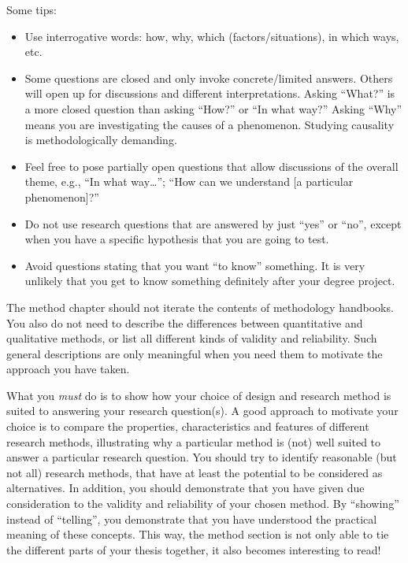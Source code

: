 \documentclass[a4paper,twoside]{bth}
\begin{document}
Some tips:
\begin{itemize}
    \item Use interrogative words: how, why, which (factors/situations), in which ways, etc.
    \item Some questions are closed and only invoke concrete/limited answers. Others will open up for discussions and different interpretations.
    Asking ``What?'' is a more closed question than asking ``How?'' or ``In what way?'' Asking ``Why'' means you are investigating the causes of a phenomenon. Studying causality is methodologically demanding.
    \item Feel free to pose partially open questions that allow discussions of the overall theme, e.g., ``In what way\dots''; ``How can we understand [a particular phenomenon]?''
    \item Do not use research questions that are answered by just ``yes'' or ``no'', except when you have a specific hypothesis that you are going to test.
    \item Avoid questions stating that you want ``to know'' something. It is very unlikely that you get to know something definitely after your degree project.
\end{itemize}

The method chapter should not iterate the contents of methodology handbooks. You also do not need to describe the differences between quantitative and qualitative methods, or list all different kinds of validity and reliability. Such general descriptions are only meaningful when you need them to motivate the approach you have taken.

What you \emph{must} do is to show how your choice of design and research method is suited to answering your research question(s). A good approach to motivate your choice is to compare the properties, characteristics and features of different research methods, illustrating why a particular method is (not) well suited to answer a particular research question. You should try to identify reasonable (but not all) research methods, that have at least the potential to be considered as alternatives. In addition, you should demonstrate that you have given due consideration to the validity and reliability of your chosen method. By ``showing'' instead of ``telling'', you demonstrate that you have understood the practical meaning of these concepts. This way, the method section is not only able to tie the different parts of your thesis together, it also becomes interesting to read!
\end{document}
